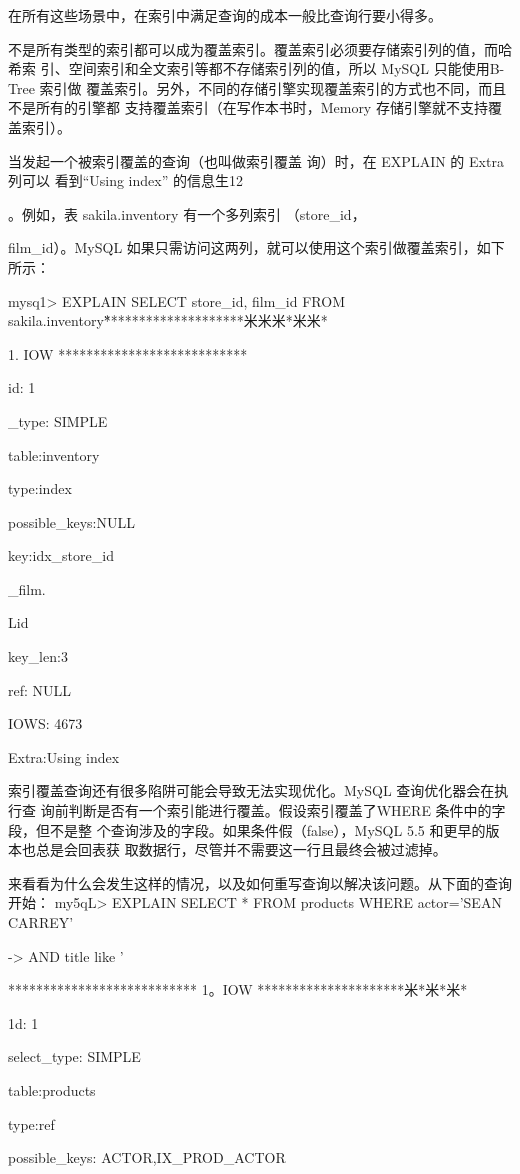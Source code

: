 在所有这些场景中，在索引中满足查询的成本一般比查询行要小得多。

不是所有类型的索引都可以成为覆盖索引。覆盖索引必须要存储索引列的值，而哈希索
引、空间索引和全文索引等都不存储索引列的值，所以 MySQL 只能使用B-Tree 索引做
覆盖索引。另外，不同的存储引擎实现覆盖索引的方式也不同，而且不是所有的引擎都
支持覆盖索引（在写作本书时，Memory 存储引擎就不支持覆盖索引）。

当发起一个被索引覆盖的查询（也叫做索引覆盖 询）时，在 EXPLAIN 的 Extra列可以
看到“Using index” 的信息生12

。例如，表 sakila.inventory 有一个多列索引 （store\_id，

film\_id）。MySQL 如果只需访问这两列，就可以使用这个索引做覆盖索引，如下所示：

mysq1> EXPLAIN SELECT store\_id, film\_id FROM sakila.inventory\G

********************米米米*米米*

1. IOW ***************************

id: 1

\_type: SIMPLE

table:inventory

type:index

possible\_keys:NULL

key:idx\_store\_id

\_film.

Lid

key\_len:3

ref: NULL

IOWS: 4673

Extra:Using index

索引覆盖查询还有很多陷阱可能会导致无法实现优化。MySQL 查询优化器会在执行查
询前判断是否有一个索引能进行覆盖。假设索引覆盖了WHERE 条件中的字段，但不是整
个查询涉及的字段。如果条件假（false），MySQL 5.5 和更早的版本也总是会回表获
取数据行，尽管并不需要这一行且最终会被过滤掉。

来看看为什么会发生这样的情况，以及如何重写查询以解决该问题。从下面的查询开始：
my5qL> EXPLAIN SELECT * FROM products WHERE actor='SEAN CARREY'

-> AND title like '%

*************************** 1。IOW *********************米*米*米*

1d: 1

select\_type: SIMPLE

table:products

type:ref

possible\_keys: ACTOR,IX\_PROD\_ACTOR

